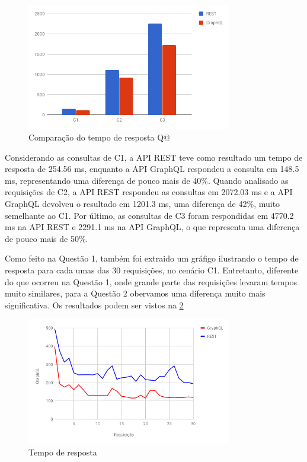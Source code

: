 \begin{figure}[htbp]
    \centering
    \includegraphics[width=0.8\textwidth]{figuras/q1-time.png}
    \caption{Comparação do tempo de resposta Q@}
    \label{fig:q2-time}
    \author{fonte: Autor}
\end{figure}

Considerando as consultas de C1, a API REST teve como resultado um tempo de resposta de 254.56 ms, enquanto a API GraphQL respondeu a consulta em 148.5 ms, representando uma diferença de pouco mais de 40\%. Quando analisado as requisições de C2, a API REST respondeu as consultas em 2072.03 ms e a API GraphQL devolveu o resultado em 1201.3 ms, uma diferença de 42\%, muito semelhante ao C1. Por último, as consultas de C3 foram respondidas em 4770.2 ms na API REST e 2291.1 ms na API GraphQL, o que representa uma diferença de pouco mais de 50\%.

Como feito na Questão 1, também foi extraido um gráfigo ilustrando o tempo de resposta para cada umas das 30 requisições, no cenário C1. Entretanto, diferente do que ocorreu na Questão 1, onde grande parte das requisições levaram tempos muito similares, para a Questão 2 obervamos uma diferença muito mais significativa. Os resultados podem ser vistos na \ref{fig:q2-time-line}

\begin{figure}[htbp]
    \centering
    \includegraphics[width=0.8\textwidth]{figuras/q2-time-line.png}
    \caption{Tempo de resposta}
    \label{fig:q2-time-line}
    \author{fonte: Autor}
\end{figure}

